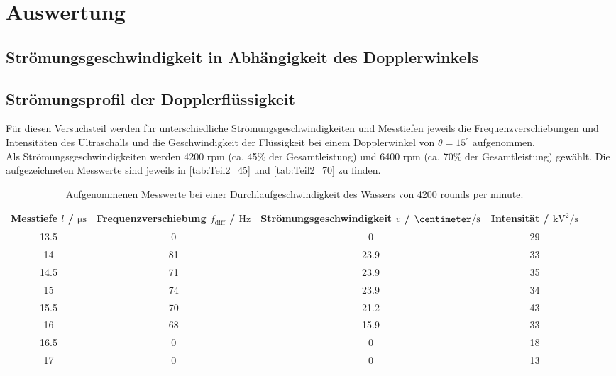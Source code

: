\section{Auswertung}
\label{sec:Auswertung}

\subsection{Strömungsgeschwindigkeit in Abhängigkeit des Dopplerwinkels}



\subsection{Strömungsprofil der Dopplerflüssigkeit}

Für diesen Versuchsteil werden für unterschiedliche Strömungsgeschwindigkeiten und Messtiefen jeweils die
Frequenzverschiebungen und Intensitäten des Ultraschalls und die Geschwindigkeit der Flüssigkeit
bei einem Dopplerwinkel von $\theta = 15^{\circ}$ aufgenommen.\\
Als Strömungsgeschwindigkeiten werden 4200 rpm (ca. 45\% der Gesamtleistung) und 6400 rpm (ca. 70\% der
Gesamtleistung) gewählt. Die aufgezeichneten Messwerte sind jeweils in \autoref{tab:Teil2_45} und 
\autoref{tab:Teil2_70} zu finden.\\

\begin{table}
  \centering
  \begin{tabular}{c c c c}
    \toprule
    Messtiefe $l$ / $\si{\micro\second}$ & Frequenzverschiebung $f_{\mathrm{diff}}$ / $\si{\hertz}$ & Strömungsgeschwindigkeit $v$ / $\si{\centimeter\per\second}$ & Intensität / $\si{\kilo\volt\squared\per\second}$ \\
    \midrule
    13.5        &    0      &     0         &      29\\
    14          &    81     &     23.9      &      33\\
    14.5        &    71     &     23.9      &      35\\
    15          &    74     &     23.9      &      34\\
    15.5        &    70     &     21.2      &      43\\
    16          &    68     &     15.9      &      33\\
    16.5        &    0      &     0         &      18\\
    17          &    0      &     0         &      13\\
    \bottomrule
  \end{tabular}
  \caption{Aufgenommenen Messwerte bei einer Durchlaufgeschwindigkeit des Wassers von 4200 rounds per minute.}
  \label{tab:Teil2_45}
\end{table}

